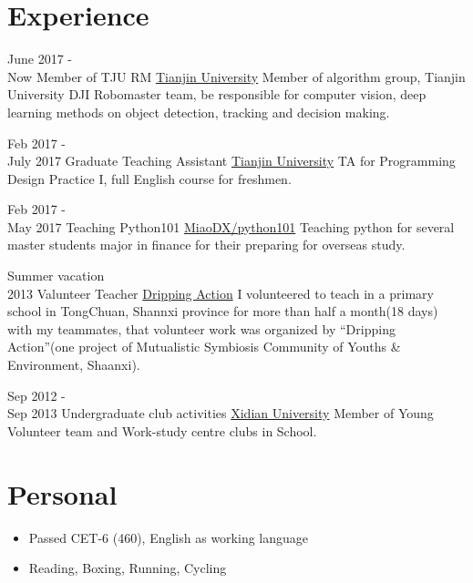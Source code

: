 \documentclass[utf8]{twentysecondcv} %
\begin{document}
\section{Experience}

\begin{twenty}

\twentyitem
    {June 2017 - \\ Now}
    {Member of TJU RM}
    {\href{http://tju.edu.cn/}{Tianjin University}}
    {}
    {Member of algorithm group, Tianjin University DJI Robomaster team, be responsible for computer vision, deep learning methods on object detection, tracking and decision making.}



\twentyitem
    {Feb 2017 - \\ July 2017}
    {Graduate Teaching Assistant}
    {\href{http://tju.edu.cn/}{Tianjin University}}
    {}
    {TA for Programming Design Practice I, full English course for freshmen.}    

\twentyitem
    {Feb 2017 - \\ May 2017}
    {Teaching Python101}
    {\href{https://github.com/MiaoDX/python101}{MiaoDX/python101}}
    {}
    {Teaching python for several master students major in finance for their preparing for overseas study.}    

\twentyitem
    {Summer vacation \\ 2013}
    {Valunteer Teacher}
    {\href{http://blog.sina.com.cn/xiaanedu}{Dripping Action}}
    {}
    {I volunteered to teach in a primary school in TongChuan, Shannxi province for more than half a month(18 days) with my teammates, that volunteer work was organized by “Dripping Action”(one project of Mutualistic Symbiosis Community of Youths \& Environment, Shaanxi).
    }


\twentyitem
    {Sep 2012 - \\ Sep 2013}
    {Undergraduate club activities}
    {\href{http://www.xidian.edu.cn/}{Xidian University}}
    {}
    {Member of Young Volunteer team and Work-study centre clubs in
School.}    


    
    
\end{twenty}

\section{Personal}

\begin{twenty} %
    
\twentyitem
    {}
    {}
    {}
    {}
    {        
        {\begin{itemize}
            \item Passed CET-6 (460), English as working language
            \item Reading, Boxing, Running, Cycling          
        \end{itemize}
         }
    }    
        
\end{twenty}
\end{document}
